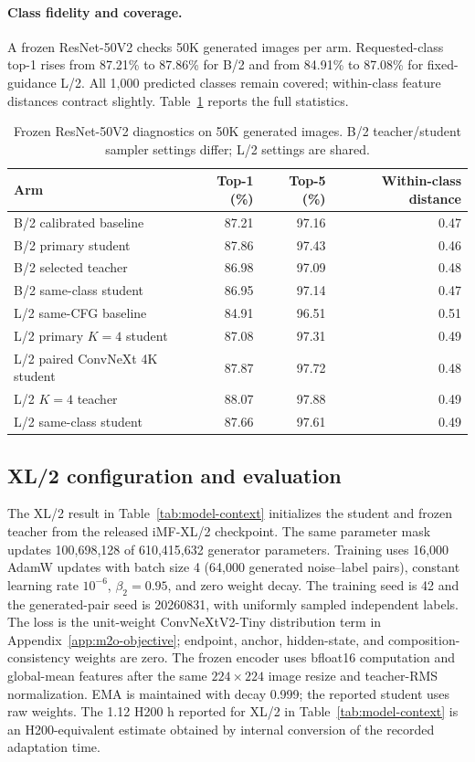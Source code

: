\paragraph{Class fidelity and coverage.}
A frozen ResNet-50V2 checks 50K generated images per arm.
Requested-class top-1 rises from 87.21\% to 87.86\% for B/2 and from
84.91\% to 87.08\% for fixed-guidance L/2. All 1,000 predicted classes
remain covered; within-class feature distances contract slightly.
Table~\ref{tab:diagnostics} reports the full statistics.

\begin{table}[!t]
\centering
\caption{Frozen ResNet-50V2 diagnostics on 50K generated images.
B/2 teacher/student sampler settings differ; L/2 settings are shared.}
\begin{tabular}{lrrr}
\toprule
Arm & Top-1 (\%) & Top-5 (\%) & Within-class distance \\
\midrule
B/2 calibrated baseline & 87.21 & 97.16 & 0.47 \\
B/2 primary student & 87.86 & 97.43 & 0.46 \\
B/2 selected teacher & 86.98 & 97.09 & 0.48 \\
B/2 same-class student & 86.95 & 97.14 & 0.47 \\
\midrule
L/2 same-CFG baseline & 84.91 & 96.51 & 0.51 \\
L/2 primary $K=4$ student & 87.08 & 97.31 & 0.49 \\
L/2 paired ConvNeXt 4K student & 87.87 & 97.72 & 0.48 \\
L/2 $K=4$ teacher & 88.07 & 97.88 & 0.49 \\
L/2 same-class student & 87.66 & 97.61 & 0.49 \\
\bottomrule
\end{tabular}
\label{tab:diagnostics}
\end{table}

\subsection{XL/2 configuration and evaluation}
\label{app:xl-protocol}
The XL/2 result in Table~\ref{tab:model-context} initializes the student and
frozen teacher from the released iMF-XL/2 checkpoint. The same parameter
mask updates 100,698,128 of 610,415,632 generator parameters. Training uses
16,000 AdamW updates with batch size 4 (64,000 generated noise--label pairs),
constant learning rate $10^{-6}$, $\beta_2=0.95$, and zero weight decay.
The training seed is 42 and the generated-pair seed is 20260831, with
uniformly sampled independent labels. The loss is the unit-weight
ConvNeXtV2-Tiny distribution term in Appendix~\ref{app:m2o-objective};
endpoint, anchor, hidden-state, and composition-consistency weights are zero.
The frozen encoder uses bfloat16 computation and global-mean features after
the same $224\times224$ image resize and teacher-RMS normalization.
EMA is maintained with decay 0.999; the reported student uses raw weights.
The 1.12 H200 h reported for XL/2 in Table~\ref{tab:model-context} is an
H200-equivalent estimate obtained by internal conversion of the recorded
adaptation time.

